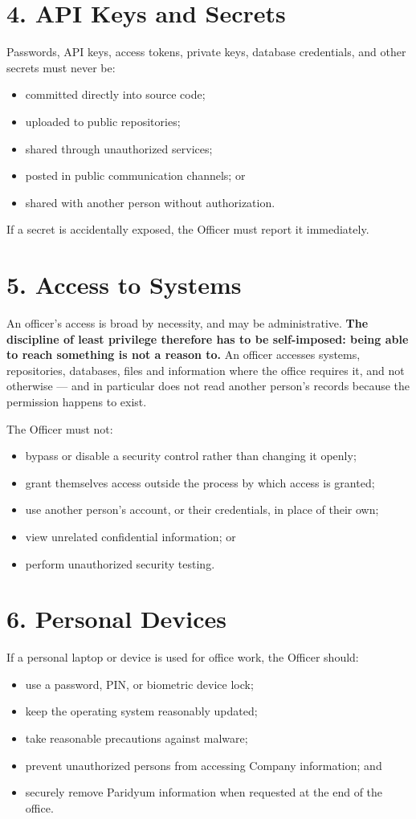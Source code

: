 \documentclass{paridyum}
\begin{document}
\section*{4. API Keys and Secrets}
Passwords, API keys, access tokens, private keys, database credentials, and other
secrets must never be:
\begin{itemize}[leftmargin=*, noitemsep]
    \item committed directly into source code;
    \item uploaded to public repositories;
    \item shared through unauthorized services;
    \item posted in public communication channels; or
    \item shared with another person without authorization.
\end{itemize}
If a secret is accidentally exposed, the Officer must report it immediately.

\section*{5. Access to Systems}
An officer's access is broad by necessity, and may be administrative. \textbf{The
discipline of least privilege therefore has to be self-imposed: being able to reach
something is not a reason to.} An officer accesses systems, repositories, databases,
files and information where the office requires it, and not otherwise --- and in
particular does not read another person's records because the permission happens to
exist.

The Officer must not:
\begin{itemize}[leftmargin=*, noitemsep]
    \item bypass or disable a security control rather than changing it openly;
    \item grant themselves access outside the process by which access is granted;
    \item use another person's account, or their credentials, in place of their own;
    \item view unrelated confidential information; or
    \item perform unauthorized security testing.
\end{itemize}

\section*{6. Personal Devices}
If a personal laptop or device is used for office work, the Officer should:
\begin{itemize}[leftmargin=*, noitemsep]
    \item use a password, PIN, or biometric device lock;
    \item keep the operating system reasonably updated;
    \item take reasonable precautions against malware;
    \item prevent unauthorized persons from accessing Company information; and
    \item securely remove Paridyum information when requested at the end of the
          office.
\end{itemize}
\end{document}
